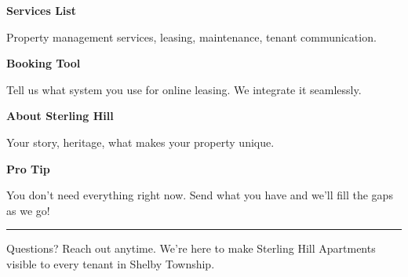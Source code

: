 \documentclass[11pt,letterpaper]{article}
\begin{document}
\begin{minipage}[t]{0.48\textwidth}
\begin{tcolorbox}[colframe=accent-teal, boxrule=1pt, left=0.7em, right=0.7em, top=0.5em, bottom=0.5em, arc=4pt, boxsep=0pt]
{\bfseries\small\color{accent-teal}Services List}

\vspace{0.15em}

{\small Property management services, leasing, maintenance, tenant communication.}
\end{tcolorbox}

\vspace{0.1em}

\begin{tcolorbox}[colframe=accent-teal, boxrule=1pt, left=0.7em, right=0.7em, top=0.5em, bottom=0.5em, arc=4pt, boxsep=0pt]
{\bfseries\small\color{accent-teal}Booking Tool}

\vspace{0.15em}

{\small Tell us what system you use for online leasing. We integrate it seamlessly.}
\end{tcolorbox}

\vspace{0.1em}

\begin{tcolorbox}[colframe=accent-teal, boxrule=1pt, left=0.7em, right=0.7em, top=0.5em, bottom=0.5em, arc=4pt, boxsep=0pt]
{\bfseries\small\color{accent-teal}About Sterling Hill}

\vspace{0.15em}

{\small Your story, heritage, what makes your property unique.}
\end{tcolorbox}

\vspace{-0.2em}
\end{minipage}

\vspace{0.15em}

\begin{tcolorbox}[colback={accent-red!5}, colframe=accent-red!20, boxrule=0.5pt, left=0.7em, right=0.7em, top=0.4em, bottom=0.4em, arc=6pt, boxsep=0pt]

{\bfseries\small\color{accent-red}Pro Tip}

\vspace{0.1em}

{\small You don't need everything right now. Send what you have and we'll fill the gaps as we go!}

\end{tcolorbox}

\vspace{0.15em}

\noindent\hrule
\vspace{0.2em}

{\small\color{text-light}Questions? Reach out anytime. We're here to make Sterling Hill Apartments visible to every tenant in Shelby Township.}
\end{document}
